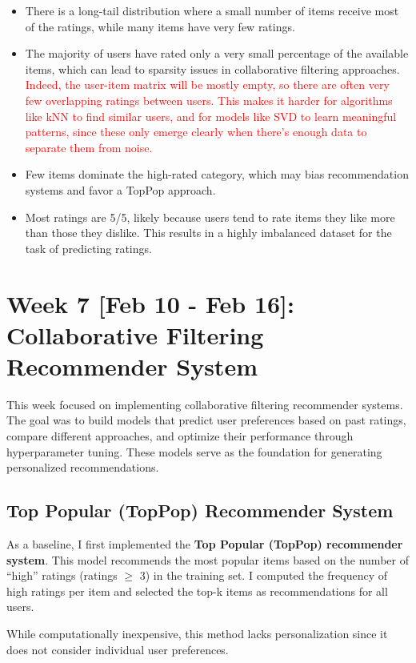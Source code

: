 \documentclass[11pt,a4paper]{article}
\begin{document}
\begin{itemize}
    \item There is a long-tail distribution where a small number of items receive most of the ratings, while many items have very few ratings.
    \item The majority of users have rated only a very small percentage of the available items, which can lead to sparsity issues in collaborative filtering approaches. \textcolor{red}{Indeed, the user-item matrix will be mostly empty, so there are often very few overlapping ratings between users. This makes it harder for algorithms like kNN to find similar users, and for models like SVD to learn meaningful patterns, since these only emerge clearly when there’s enough data to separate them from noise.}
    \item Few items dominate the high-rated category, which may bias recommendation systems and favor a TopPop approach.
    \item Most ratings are 5/5, likely because users tend to rate items they like more than those they dislike. This results in a highly imbalanced dataset for the task of predicting ratings.
\end{itemize}

\section{Week 7 [Feb 10 - Feb 16]: Collaborative Filtering Recommender System}

This week focused on implementing collaborative filtering recommender systems. The goal was to build models that predict user preferences based on past ratings, compare different approaches, and optimize their performance through hyperparameter tuning. These models serve as the foundation for generating personalized recommendations.

\subsection{Top Popular (TopPop) Recommender System}

As a baseline, I first implemented the \textbf{Top Popular (TopPop) recommender system}. This model recommends the most popular items based on the number of ``high'' ratings (ratings $\geq$ 3) in the training set. I computed the frequency of high ratings per item and selected the top-k items as recommendations for all users.

While computationally inexpensive, this method lacks personalization since it does not consider individual user preferences.
\end{document}
